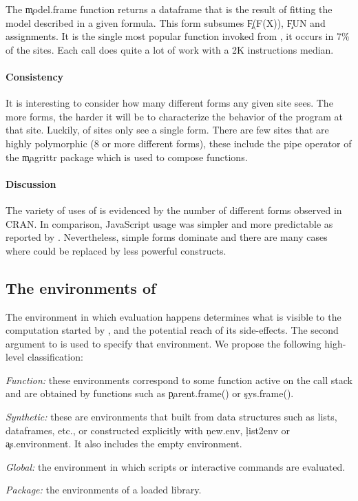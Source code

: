 \documentclass[screen,acmsmall]{acmart}
\begin{document}
\medskip\noindent{} The \c{model.frame} function
returns a dataframe that is the result of fitting the model described in a given
formula. This form subsumes \c{F(F(X))}, \c{FUN} and assignments. It is the
single most popular function invoked from \eval, it occurs in 7\% of the sites.
Each call does quite a lot of work with a 2K instructions median.

\paragraph{Consistency} It is interesting to consider how many different
forms any given site sees. The more forms, the harder it will be to characterize
the behavior of the program at that site. Luckily, \packageNbOneMinimizedPercent
of sites only see a single form. There are few sites that are highly polymorphic
(8 or more different forms), these include the pipe operator of the \c{magrittr}
package which is used to compose functions.

\paragraph{Discussion} The variety of uses of \eval is evidenced by the number
of different forms observed in CRAN. In comparison, JavaScript \eval usage was
simpler and more predictable as reported by \citet{oopsla12b}. Nevertheless,
simple forms dominate and there are many cases where \eval could be replaced
by less powerful constructs.


\newpage

\subsection{The environments of \eval}\label{sec:env}

The environment in which evaluation happens determines what is visible to the
computation started by \eval, and the potential reach of its side-effects. The
second argument to \eval is used to specify that environment. We propose the
following high-level classification:

\begin{compactitem}[---]
\item \emph{Function:} these environments correspond to some function active on
  the call stack and are obtained by functions such as \c{parent.frame()} or
  \c{sys.frame()}.
\item \emph{Synthetic:} these are environments that built from data structures
  such as lists, dataframes, etc., or constructed explicitly with \c{new.env},
  \c{list2env} or \c{as.environment}. It also includes the empty environment.
\item \emph{Global:} the environment in which scripts or interactive commands
  are evaluated.
\item \emph{Package:} the environments of a loaded library.
\end{compactitem}
\end{document}
